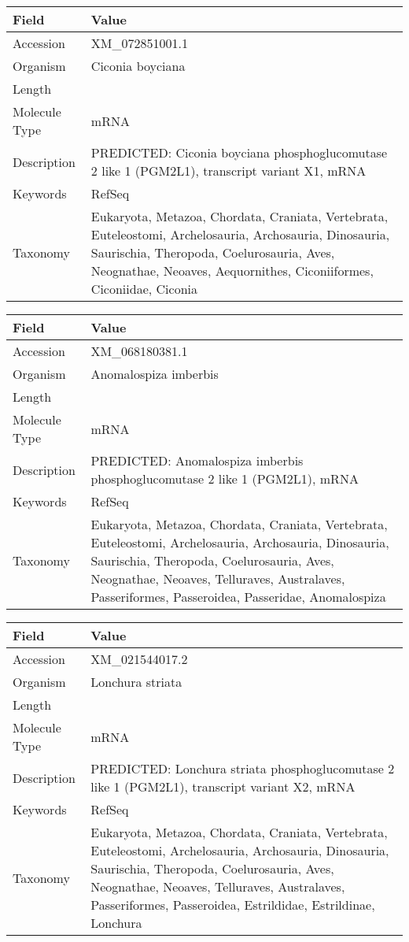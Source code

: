 \documentclass[10pt]{article}
\begin{document}
{\footnotesize
\begin{longtable}{>{\raggedright\arraybackslash}p{4.5cm} >{\raggedright\arraybackslash}p{11.5cm}}
\textbf{Field} & \textbf{Value} \\
\hline
Accession & XM\_072851001.1 \\
Organism & Ciconia boyciana \\
Length & 6462 \\
Molecule Type & mRNA \\
Description & PREDICTED: Ciconia boyciana phosphoglucomutase 2 like 1 (PGM2L1), transcript variant X1, mRNA \\
Keywords & RefSeq \\
Taxonomy & Eukaryota, Metazoa, Chordata, Craniata, Vertebrata, Euteleostomi, Archelosauria, Archosauria, Dinosauria, Saurischia, Theropoda, Coelurosauria, Aves, Neognathae, Neoaves, Aequornithes, Ciconiiformes, Ciconiidae, Ciconia \\
\end{longtable}
}

{\footnotesize
\begin{longtable}{>{\raggedright\arraybackslash}p{4.5cm} >{\raggedright\arraybackslash}p{11.5cm}}
\textbf{Field} & \textbf{Value} \\
\hline
Accession & XM\_068180381.1 \\
Organism & Anomalospiza imberbis \\
Length & 5509 \\
Molecule Type & mRNA \\
Description & PREDICTED: Anomalospiza imberbis phosphoglucomutase 2 like 1 (PGM2L1), mRNA \\
Keywords & RefSeq \\
Taxonomy & Eukaryota, Metazoa, Chordata, Craniata, Vertebrata, Euteleostomi, Archelosauria, Archosauria, Dinosauria, Saurischia, Theropoda, Coelurosauria, Aves, Neognathae, Neoaves, Telluraves, Australaves, Passeriformes, Passeroidea, Passeridae, Anomalospiza \\
\end{longtable}
}

{\footnotesize
\begin{longtable}{>{\raggedright\arraybackslash}p{4.5cm} >{\raggedright\arraybackslash}p{11.5cm}}
\textbf{Field} & \textbf{Value} \\
\hline
Accession & XM\_021544017.2 \\
Organism & Lonchura striata \\
Length & 5980 \\
Molecule Type & mRNA \\
Description & PREDICTED: Lonchura striata phosphoglucomutase 2 like 1 (PGM2L1), transcript variant X2, mRNA \\
Keywords & RefSeq \\
Taxonomy & Eukaryota, Metazoa, Chordata, Craniata, Vertebrata, Euteleostomi, Archelosauria, Archosauria, Dinosauria, Saurischia, Theropoda, Coelurosauria, Aves, Neognathae, Neoaves, Telluraves, Australaves, Passeriformes, Passeroidea, Estrildidae, Estrildinae, Lonchura \\
\end{longtable}
}
\end{document}
